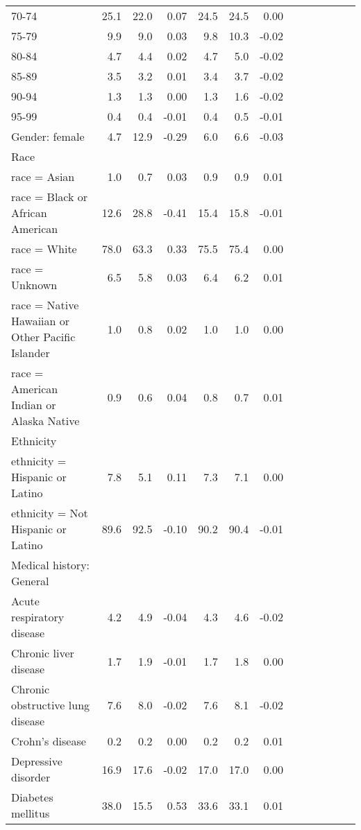 \documentclass[11pt,]{article}
\begin{document}
\begin{longtable}{lrrrrrrrrrrrr}
      70-74 & 25.1 & 22.0 &  0.07 & 24.5 & 24.5 &  0.00 \\ 
      75-79 &  9.9 &  9.0 &  0.03 &  9.8 & 10.3 & -0.02 \\ 
      80-84 &  4.7 &  4.4 &  0.02 &  4.7 &  5.0 & -0.02 \\ 
      85-89 &  3.5 &  3.2 &  0.01 &  3.4 &  3.7 & -0.02 \\ 
      90-94 &  1.3 &  1.3 &  0.00 &  1.3 &  1.6 & -0.02 \\ 
      95-99 &  0.4 &  0.4 & -0.01 &  0.4 &  0.5 & -0.01 \\ 
  Gender: female &  4.7 & 12.9 & -0.29 &  6.0 &  6.6 & -0.03 \\ 
  Race &    &    &     &    &    &     \\ 
      race = Asian &  1.0 &  0.7 &  0.03 &  0.9 &  0.9 &  0.01 \\ 
      race = Black or African American & 12.6 & 28.8 & -0.41 & 15.4 & 15.8 & -0.01 \\ 
      race = White & 78.0 & 63.3 &  0.33 & 75.5 & 75.4 &  0.00 \\ 
      race = Unknown &  6.5 &  5.8 &  0.03 &  6.4 &  6.2 &  0.01 \\ 
      race = Native Hawaiian or Other Pacific Islander &  1.0 &  0.8 &  0.02 &  1.0 &  1.0 &  0.00 \\ 
      race = American Indian or Alaska Native &  0.9 &  0.6 &  0.04 &  0.8 &  0.7 &  0.01 \\ 
  Ethnicity &    &    &     &    &    &     \\ 
      ethnicity = Hispanic or Latino &  7.8 &  5.1 &  0.11 &  7.3 &  7.1 &  0.00 \\ 
      ethnicity = Not Hispanic or Latino & 89.6 & 92.5 & -0.10 & 90.2 & 90.4 & -0.01 \\ 
  Medical history: General &    &    &     &    &    &     \\ 
      Acute respiratory disease &  4.2 &  4.9 & -0.04 &  4.3 &  4.6 & -0.02 \\ 
      Chronic liver disease &  1.7 &  1.9 & -0.01 &  1.7 &  1.8 &  0.00 \\ 
      Chronic obstructive lung disease &  7.6 &  8.0 & -0.02 &  7.6 &  8.1 & -0.02 \\ 
      Crohn's disease &  0.2 &  0.2 &  0.00 &  0.2 &  0.2 &  0.01 \\ 
      Depressive disorder & 16.9 & 17.6 & -0.02 & 17.0 & 17.0 &  0.00 \\ 
      Diabetes mellitus & 38.0 & 15.5 &  0.53 & 33.6 & 33.1 &  0.01 \\ 

\end{longtable}
\end{document}
